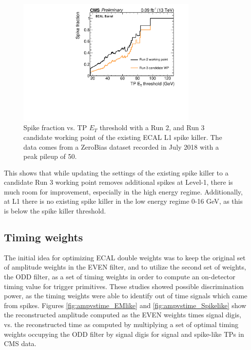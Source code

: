 \begin{figure}[H]
    \centering
    \includegraphics[width=0.8\textwidth]{Images/ECAL/DW/spikekiller_run3_optimisation.pdf}
    \caption{Spike fraction vs. TP $E_{T}$ threshold with a Run 2, and Run 3 candidate working point of the existing ECAL L1 spike killer. The data comes from a ZeroBias dataset recorded in July 2018 with a peak pileup of 50.}
    \label{fig:spikeKillerRun3optimization}
\end{figure}

This shows that while updating the settings of the existing spike killer to a candidate Run 3 working point removes additional spikes at Level-1, there is much room for improvement, especially in the high energy regime. Additionally, at L1 there is no existing spike killer in the low energy regime 0-16 GeV, as this is below the spike killer threshold. 

\subsection{Timing weights}

The initial idea for optimizing ECAL double weights was to keep the original set of amplitude weights in the EVEN filter, and to utilize the second set of weights, the ODD filter, as a set of timing weights in order to compute an on-detector timing value for trigger primitives. These studies showed possible discrimination power, as the timing weights were able to identify out of time signals which came from spikes. Figures \ref{fig:ampvstime_EMlike} and \ref{fig:ampvstime_Spikelike} show the reconstructed amplitude computed as the EVEN weights times signal digis, vs. the reconstructed time as computed by multiplying a set of optimal timing weights occupying the ODD filter by signal digis for signal and spike-like TPs in CMS data. 

